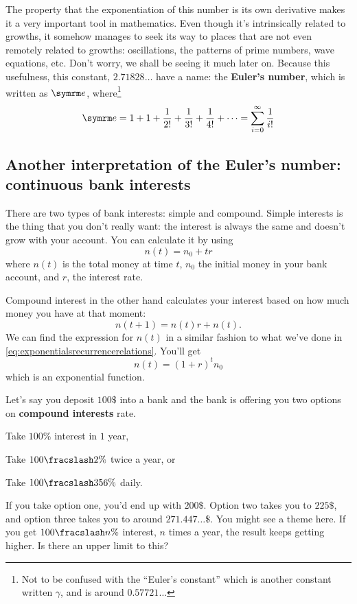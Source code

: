 The property that the exponentiation of this number is its own derivative makes it a very important tool in mathematics. Even though it's intrinsically related to growths, it somehow manages to seek its way to places that are not even remotely related to growths: oscillations, the patterns of prime numbers, wave equations, etc. Don't worry, we shall be seeing it much later on. Because this usefulness, this constant, $2.71828\dots$ have a name: the \textbf{Euler's number}, which is written as $\e$, where\footnote{Not to be confused with the ``Euler's constant'' which is another constant written $\gamma$, and is around $0.57721\dots$}
\begin{equation}
	\e = 1 + 1 + \frac{1}{2!} + \frac{1}{3!} + \frac{1}{4!} + \dots = \sum_{i = 0}^{\infty}\frac{1}{i!}
\end{equation}

\subsection{\protect Another interpretation of the Euler's number: continuous bank interests}

There are two types of bank interests: simple and compound. Simple interests is the thing that you don't really want: the interest is always the same and doesn't grow with your account. You can calculate it by using
\begin{equation}
    n(t) = n_0 + tr
\end{equation}
where $n(t)$ is the total money at time $t$, $n_0$ the initial money in your bank account, and $r$, the interest rate.

Compound interest in the other hand calculates your interest based on how much money you have at that moment:
\begin{equation}
    n(t + 1) = n(t)r + n(t).
\end{equation}
We can find the expression for $n(t)$ in a similar fashion to what we've done in \cref{eq:exponentialsrecurrencerelations}. You'll get
\begin{equation}
    n(t) = (1 + r)^tn_0 \label{eq:compoundinterestformula}
\end{equation}
which is an exponential function.

Let's say you deposit $100\$$ into a bank and the bank is offering you two options on \textbf{compound interests} rate. \begin{enumerate*}[label = \arabic*)]\item Take $100\%$ interest in $1$ year, \item Take $\flatfrac{100}{2}\%$ twice a year, or \item Take $\flatfrac{100}{356}\%$ daily.\end{enumerate*} If you take option one, you'd end up with $200\$$. Option two takes you to $225\$$, and option three takes you to around $271.447\dots\$$. You might see a theme here. If you get $\flatfrac{100}{n}\%$ interest, $n$ times a year, the result keeps getting higher. Is there an upper limit to this?

